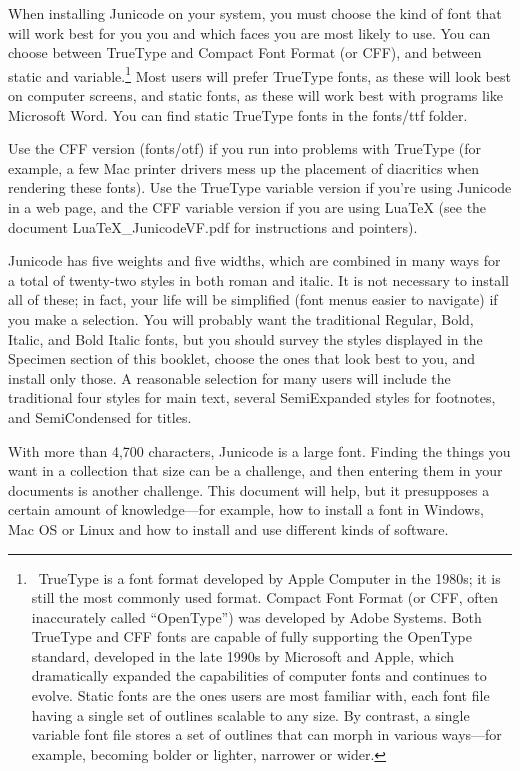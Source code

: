 \documentclass[12pt,letterpaper,openany]{book}
\newcommand{\ltech}{Lua\kern-1.5pt\TeX}
\begin{document}
When installing Junicode on your system, you must choose the kind of font that
will work best for you you
and which faces you are most likely to use. You can choose between TrueType
and Compact Font Format (or CFF), and between static and variable.\footnote{\ TrueType is a font format developed by
Apple Computer in the 1980s; it is still the most commonly used format. Compact Font Format
(or CFF, often inaccurately called “OpenType”) was developed by Adobe Systems.
Both TrueType and CFF fonts are capable of fully supporting the OpenType
standard, developed in the late 1990s by Microsoft and Apple, which dramatically expanded the
capabilities of computer fonts and continues to evolve. Static fonts are the ones
users are most familiar with, each font file having a single set of outlines
scalable to any size. By contrast, a single variable font file stores a set of
outlines that can morph in various ways—for example, becoming bolder or lighter,
narrower or wider.} Most users will prefer TrueType fonts, as
these will look best on computer screens, and static fonts, as these will work
best with programs like Microsoft Word. You can find static TrueType fonts in
the fonts/ttf folder.

Use the CFF version (fonts/otf) if you run into problems with TrueType (for example,
a few Mac printer drivers mess up the placement of diacritics when rendering
these fonts). Use the TrueType variable version if you're using Junicode in a
web page, and the CFF variable version if you are using
{\ltech} (see the document LuaTeX\_JunicodeVF.pdf for instructions and pointers).

Junicode has five weights and five widths, which are combined in many ways
for a total of twenty-two styles in
both roman and italic. It is not necessary to install all of these; in fact,
your life will be simplified (font menus easier to navigate) if you
make a selection. You will probably want the traditional Regular, Bold, Italic, and Bold
Italic fonts, but you should survey the styles displayed in the Specimen
section of this booklet, choose the ones that look best to you, and install
only those. A reasonable selection for many users will include the traditional four
styles for main text, several SemiExpanded styles for footnotes, and
SemiCondensed for titles.

With more than 4,700 characters, Junicode is a large font. Finding the things you
want in a collection that size can be a challenge, and then entering them in your
documents is another challenge. This document will help, but it
presupposes a certain amount of knowledge—for example, how to install a font in
Windows, Mac OS or Linux and how to install and use different kinds of software.
\end{document}
